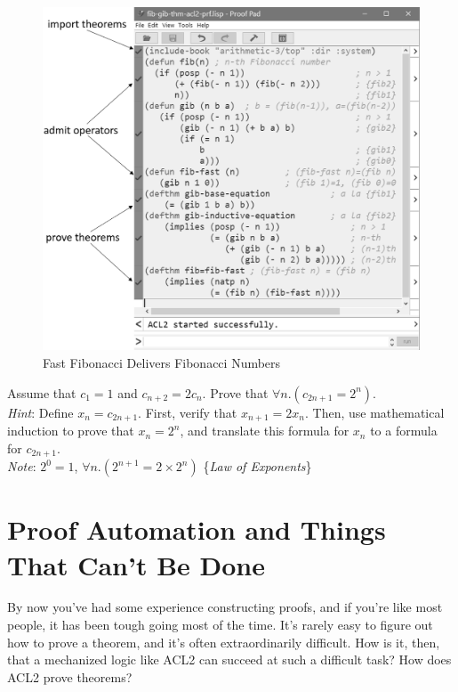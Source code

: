 \begin{figure}
\begin{center}
\includegraphics[scale=0.5]{images/fib-gib-thm-acl2-prf.png}
\end{center}
\caption{Fast Fibonacci Delivers Fibonacci Numbers}
\label{fig:fib-gib-thm}
\end{figure}

\begin{ExerciseList}

\Exercise Assume that $c_1 = 1$ and $c_{n+2} = 2c_n$.
Prove that $\forall n.(c_{2n+1} = 2^n)$.\\
\emph{Hint}: Define $x_n = c_{2n+1}$.
First, verify that $x_{n+1} = 2x_n$.
Then, use mathematical induction to prove that $x_n = 2^n$,
and translate this formula for $x_n$
to a formula for $c_{2n+1}$.\\
\emph{Note}: $2^0 = 1$, $\forall n.(2^{n+1} = 2 \times 2^n)$ \{\emph{Law of Exponents}\}

\end{ExerciseList}

\section{Proof Automation and Things That Can't Be Done}
\label{sec:halting-problem}

By now you've had some experience constructing proofs, and if you're like most people,
it has been tough going most of the time.
It's rarely easy to figure out how to prove a theorem,
and it's often extraordinarily difficult.
How is it, then, that a mechanized logic like ACL2 can succeed at such a difficult task?
How does ACL2 prove theorems?

